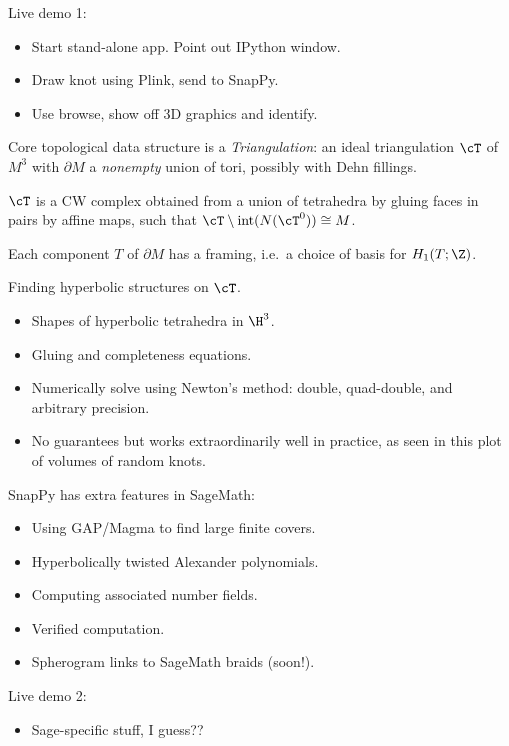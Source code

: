 \documentclass[aspect=16:10, tikz, half]{nmd/slide}
\begin{document}
\begin{frame}
  Live demo 1:
  \begin{itemize}
    \item Start stand-alone app. Point out IPython window.  
    \item Draw knot using Plink, send to SnapPy.
    \item Use browse, show off 3D graphics and identify.
  \end{itemize}
\end{frame}


\begin{frame}
  Core topological data structure is a \emph{Triangulation}: an ideal
  triangulation $\cT$ of $M^3$ with $\partial M$ a \emph{nonempty}
  union of tori, possibly with Dehn fillings.
  
  \bigskip

  $\cT$ is a CW complex obtained from a union of tetrahedra by gluing
  faces in pairs by affine maps, such that $\cT \setminus
  \mathrm{int}(N(\cT^{0})) \cong M$. 

  \bigskip

  Each component $T$ of $\partial M$ has a framing, i.e.~a choice of basis
  for $H_1(T; \Z)$. 
\end{frame}

\begin{frame}
Finding hyperbolic structures on $\cT$.
\begin{itemize}
\item Shapes of hyperbolic tetrahedra in $\H^3$.
\item Gluing and completeness equations.
\item Numerically solve using Newton's method: double, quad-double,
  and arbitrary precision. 
\item No guarantees but works extraordinarily well in practice, as
  seen in this plot of volumes of random knots.
\end{itemize}
\end{frame}

\begin{frame}
  SnapPy has extra features in SageMath: 
  \begin{itemize}
    \item Using GAP/Magma to find large finite covers.
    \item Hyperbolically twisted Alexander polynomials.
    \item Computing associated number fields. 
    \item Verified computation.
    \item Spherogram links to SageMath braids (soon!).
  \end{itemize}
\end{frame}


\begin{frame}
  Live demo 2:
  \begin{itemize}
    \item Sage-specific stuff, I guess??
  \end{itemize}
\end{frame}
\end{document}
